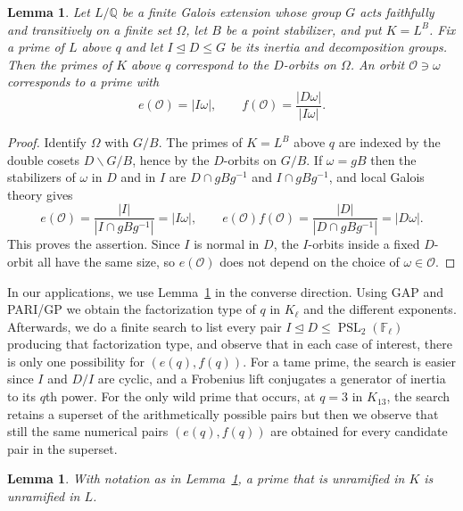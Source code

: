\documentclass[10pt]{amsart}
\numberwithin{equation}{section}
\newtheorem{lemma}[theorem]{Lemma}
\theoremstyle{definition}
\theoremstyle{remark}
\newcommand{\F}{\mathbb{F}}
\newcommand{\Q}{\mathbb{Q}}
\newcommand{\PSL}{\operatorname{PSL}}
\begin{document}
\begin{lemma}\label{lem:orbit-dictionary}
Let $L/\Q$ be a finite Galois extension whose group $G$ acts faithfully and
transitively on a finite set $\Omega$, let $B$ be a point stabilizer, and put
$K=L^B$.  Fix a prime of $L$ above $q$ and let $I\trianglelefteq D\leq G$ be
its inertia and decomposition groups.  Then the primes of $K$ above $q$
correspond to the $D$-orbits on $\Omega$. An orbit $\mathcal O\ni\omega$ corresponds to a prime with
\begin{equation}\label{eq:orbit-dictionary}
 e(\mathcal O)=|I\omega|,
 \qquad
 f(\mathcal O)=\frac{|D\omega|}{|I\omega|} .
\end{equation}
\end{lemma}

\begin{proof}
Identify $\Omega$ with $G/B$.  The primes of $K=L^B$ above $q$ are indexed by
the double cosets $D\backslash G/B$, hence by the $D$-orbits on $G/B$.  If
$\omega=gB$ then the stabilizers of $\omega$ in $D$ and in $I$ are
$D\cap gBg^{-1}$ and $I\cap gBg^{-1}$, and local Galois theory gives
\[
 e(\mathcal O)=\frac{|I|}{|I\cap gBg^{-1}|}=|I\omega|,
 \qquad
 e(\mathcal O)f(\mathcal O)=\frac{|D|}{|D\cap gBg^{-1}|}=|D\omega|.
\]
This proves the assertion.  Since $I$ is normal in $D$, the
$I$-orbits inside a fixed $D$-orbit all have the same size, so
$e(\mathcal O)$ does not depend on the choice of $\omega\in\mathcal O$.
\end{proof}

In our applications, we use Lemma~\ref{lem:orbit-dictionary} in the converse direction.  Using GAP and PARI/GP we obtain the factorization type of $q$ in $K_\ell$ and
the different exponents. Afterwards, we do a finite search to list every pair $I\trianglelefteq D\leq \PSL_2(\F_\ell)$ producing that factorization type, and observe that in each case of
interest, there is only one possibility for $(e(q),f(q))$. For a tame prime, the search is easier since $I$ and $D/I$ are cyclic, and a Frobenius lift conjugates a generator of inertia to its $q$th power. For the
only wild prime that occurs, at $q=3$ in $K_{13}$, the search
retains a superset of the arithmetically possible pairs but then we observe that still the same numerical pairs $(e(q),f(q))$ are obtained for every candidate pair in the superset.


\begin{lemma}\label{lem:no-hidden-ramification}
With notation as in Lemma~\ref{lem:orbit-dictionary}, a prime that is
unramified in $K$ is unramified in $L$.
\end{lemma}
\end{document}
